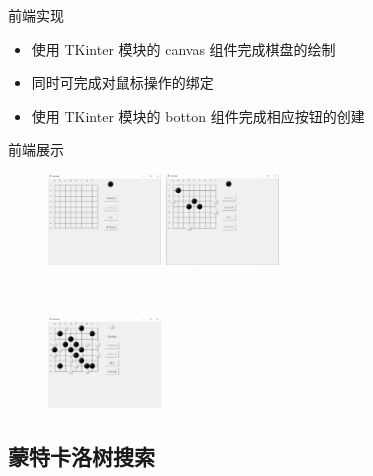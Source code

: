 \documentclass[compress]{beamer}
\begin{document}
\begin{frame}{前端实现}
  \begin{itemize}
    \item 使用 TKinter 模块的 canvas 组件完成棋盘的绘制
    \item 同时可完成对鼠标操作的绑定
		  \pause
	\\[5mm]
	\item 使用 TKinter 模块的 botton 组件完成相应按钮的创建
  \end{itemize}
\end{frame}

\begin{frame}{前端展示}
  \begin{figure}[htbp]
    \centering
    \begin{minipage}[t]{0.4\textwidth}
      \centering
      \includegraphics[width=3cm]{uiempty.png}
    \end{minipage}
    \begin{minipage}[t]{0.4\textwidth}
      \centering
      \includegraphics[width=3cm]{uihalf.png}
    \end{minipage}
	\\[5mm]
    \begin{minipage}[t]{0.4\textwidth}
      \centering
      \includegraphics[width=3cm]{uidone.png}
    \end{minipage}
  \end{figure}
\end{frame}

\subsection{蒙特卡洛树搜索}
\end{document}
